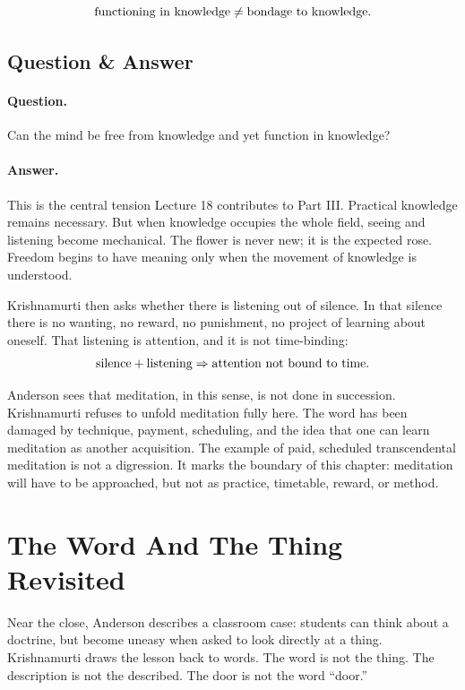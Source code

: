 \documentclass[11pt,oneside]{book}
\begin{document}
\begin{equation}
\hbox{functioning in knowledge}
\neq
\hbox{bondage to knowledge}.
\end{equation}

\subsection{Question \& Answer}

\paragraph{Question.}
Can the mind be free from knowledge and yet function in knowledge?

\paragraph{Answer.}
This is the central tension Lecture 18 contributes to Part III. Practical knowledge remains necessary. But when knowledge occupies the whole field, seeing and listening become mechanical. The flower is never new; it is the expected rose. Freedom begins to have meaning only when the movement of knowledge is understood.

Krishnamurti then asks whether there is listening out of silence. In that silence there is no wanting, no reward, no punishment, no project of learning about oneself. That listening is attention, and it is not time-binding:
\begin{equation}
\hbox{silence}+\hbox{listening}
\Rightarrow
\hbox{attention not bound to time}.
\end{equation}

Anderson sees that meditation, in this sense, is not done in succession. Krishnamurti refuses to unfold meditation fully here. The word has been damaged by technique, payment, scheduling, and the idea that one can learn meditation as another acquisition. The example of paid, scheduled transcendental meditation is not a digression. It marks the boundary of this chapter: meditation will have to be approached, but not as practice, timetable, reward, or method.

\section{The Word And The Thing Revisited}

Near the close, Anderson describes a classroom case: students can think about a doctrine, but become uneasy when asked to look directly at a thing. Krishnamurti draws the lesson back to words. The word is not the thing. The description is not the described. The door is not the word ``door.''
\end{document}
